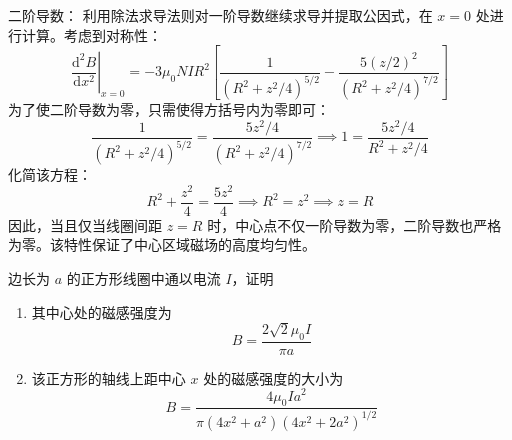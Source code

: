 \begin{solution}
\begin{enumerate}
    二阶导数：
    利用除法求导法则对一阶导数继续求导并提取公因式，在 $x=0$ 处进行计算。考虑到对称性：
    $$ \left. \frac{\mathrm{d}^2 B}{\mathrm{d}x^2} \right|_{x=0} = -3\mu_0 N I R^2 \left[ \frac{1}{\left(R^2 + z^2/4\right)^{5/2}} - \frac{5(z/2)^2}{\left(R^2 + z^2/4\right)^{7/2}} \right] $$
    为了使二阶导数为零，只需使得方括号内为零即可：
    $$ \frac{1}{\left(R^2 + z^2/4\right)^{5/2}} = \frac{5z^2/4}{\left(R^2 + z^2/4\right)^{7/2}} \implies 1 = \frac{5z^2/4}{R^2 + z^2/4} $$
    化简该方程：
    $$ R^2 + \frac{z^2}{4} = \frac{5z^2}{4} \implies R^2 = z^2 \implies z = R $$
    因此，当且仅当线圈间距 $z=R$ 时，中心点不仅一阶导数为零，二阶导数也严格为零。该特性保证了中心区域磁场的高度均匀性。
\end{enumerate}
\end{solution}

\begin{exercise}\label{ex:17.3}
边长为 $a$ 的正方形线圈中通以电流 $I$，证明
\begin{enumerate}
  \item[(a)] 其中心处的磁感强度为
  $$ B = \frac{2\sqrt{2}\mu_0 I}{\pi a} $$
  \item[(b)] 该正方形的轴线上距中心 $x$ 处的磁感强度的大小为
  $$ B = \frac{4\mu_0 I a^2}{\pi(4x^2 + a^2)(4x^2 + 2a^2)^{1/2}} $$
\end{enumerate}
\end{exercise}
